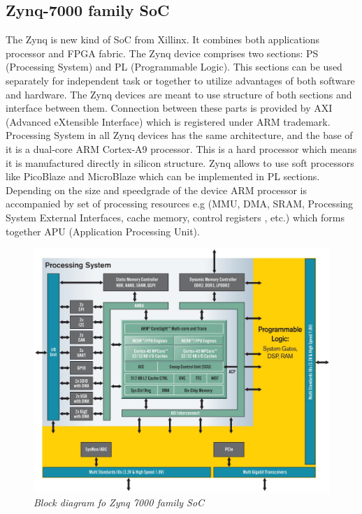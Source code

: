 \documentclass[en,printmode]{mgr}
\begin{document}
		\subsection*{Zynq-7000 family SoC}
		The Zynq is new kind of SoC from Xillinx. It combines both applications processor and FPGA 	
		fabric. The Zynq device comprises two sections: PS (Processing System) and PL (Programmable
		Logic). This sections can be used separately for independent task or together to utilize
		advantages of both software and hardware. The Zynq devices are meant to use structure of
		both sections and interface between them. Connection between these parts is provided by AXI
		(Advanced eXtensible Interface) which is registered under ARM trademark.
		\\
		
		Processing System in all Zynq devices has the same architecture, and the base of it is
		a dual-core ARM Cortex-A9 processor. This is a hard processor which means it is manufactured
		directly in silicon structure. Zynq allows to use soft processors like PicoBlaze and 
		MicroBlaze which can be implemented in PL sections. Depending on the size and speedgrade of
		the device ARM processor is accompanied by set of processing resources e.g (MMU, DMA, SRAM,
		Processing System External Interfaces, cache memory, control registers , etc.) which forms
		together APU (Application Processing Unit).
		
		\begin{figure}[!htb]
    		\centering
   			\includegraphics[width=\textwidth]{images/zynq.jpeg}
   		 	\caption{\textit{Block diagram fo Zynq 7000 family SoC}}
		\end{figure}
		\newpage
\end{document}

